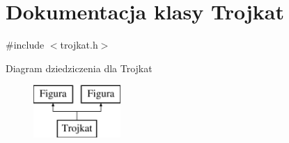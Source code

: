 \hypertarget{classTrojkat}{\section{Dokumentacja klasy Trojkat}
\label{classTrojkat}
}


{\ttfamily \#include $<$trojkat.\-h$>$}

Diagram dziedziczenia dla Trojkat\begin{figure}[H]
\begin{center}
\leavevmode
\includegraphics[height=2.000000cm]{d4/d42/classTrojkat}
\end{center}
\end{figure}
